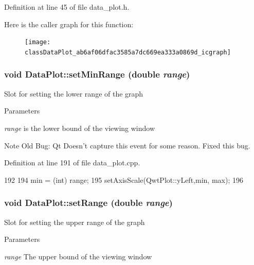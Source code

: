 Definition at line 45 of file data\_\-plot.h.








Here is the caller graph for this function:\nopagebreak
\begin{figure}[H]
\begin{center}
\leavevmode
\texttt{[image: classDataPlot\_ab6af06dfac3585a7dc669ea333a0869d\_icgraph]}
\end{center}
\end{figure}


\hypertarget{classDataPlot_ad101ac80563ee10322788946d791ea09}{
\subsubsection[{setMinRange}]{\setlength{\rightskip}{0pt plus 5cm}void DataPlot::setMinRange (double {\em range})}}
\label{classDataPlot_ad101ac80563ee10322788946d791ea09}
Slot for setting the lower range of the graph 
\begin{DoxyParams}{Parameters}
\item[{\em range}]is the lower bound of the viewing window \end{DoxyParams}


\begin{DoxyNote}{Note}
Old Bug: Qt Doesn't capture this event for some reason. Fixed this bug. 
\end{DoxyNote}




Definition at line 191 of file data\_\-plot.cpp.




\begin{DoxyCode}
192 {
194     min = (int) range;
195     setAxisScale(QwtPlot::yLeft,min, max);
196 }
\end{DoxyCode}


\hypertarget{classDataPlot_a642185fdad89b1b075bc00670242fa0b}{
\subsubsection[{setRange}]{\setlength{\rightskip}{0pt plus 5cm}void DataPlot::setRange (double {\em range})}}
\label{classDataPlot_a642185fdad89b1b075bc00670242fa0b}
Slot for setting the upper range of the graph 
\begin{DoxyParams}{Parameters}
\item[{\em range}]The upper bound of the viewing window \end{DoxyParams}


